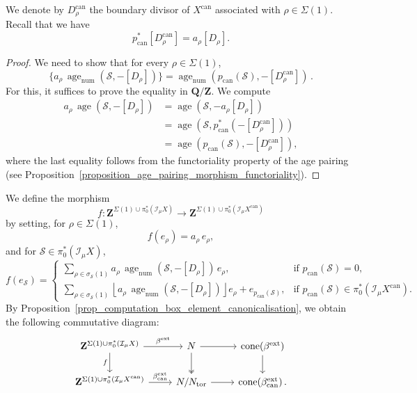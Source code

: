 \documentclass{proc-l}
\newcommand{\Z}{\mathbf{Z}}
\newcommand{\Q}{\mathbf{Q}}
\newcommand{\I}{\mathcal{I}}
\DeclareMathOperator{\can}{can}
\DeclareMathOperator{\coneform}{cone}
\DeclareMathOperator{\num}{num}
\DeclareMathOperator{\age}{age}
\DeclareMathOperator{\tor}{tor}
\DeclareMathOperator{\ext}{ext}
\newcommand{\stackS}{\mathcal{S}}
\newcommand{\sheafI}{\mathcal{I}}
\newcommand{\twistsector}{\pi_0^*(\sheafI_{\mu} X)}
\theoremstyle{definition}
\theoremstyle{remark}
\numberwithin{equation}{section}
\begin{document}
We denote by $D_{\rho}^{\can}$ the boundary divisor of $X^{\can}$ associated with $\rho \in \Sigma(1)$. Recall that we have
$$
p_{\can}^*[D^{\can}_{\rho}] = a_{\rho}[D_{\rho}] .
$$

\begin{proof}
We need to show that for every $\rho \in \Sigma(1)$,
$$
\{a_{\rho}\,\age_{\num}(\stackS,-[D_{\rho}]) \}
=
\age_{\num}(p_{\can}(\stackS),-[D^{\can}_{\rho}]) \, .
$$
For this, it suffices to prove the equality in $\Q/\Z$. We compute
\begin{align*}
a_{\rho}\,\age(\stackS,-[D_{\rho}])
&=
\age(\stackS,-a_{\rho}[D_{\rho}]) \\
&=
\age(\stackS,p_{\can}^*(-[D^{\can}_{\rho}])) \\
&=
\age(p_{\can}(\stackS),-[D^{\can}_{\rho}]),
\end{align*}
where the last equality follows from the functoriality property of the age pairing (see Proposition~\ref{proposition_age_pairing_morphism_functoriality}).
\end{proof}

We define the morphism
$$
f : \Z^{\Sigma(1) \cup \twistsector}
\longrightarrow
\Z^{\Sigma(1) \cup \pi_0^*(\I_{\mu} X^{\can})}
$$
by setting, for $\rho \in \Sigma(1)$,
\[
f(e_{\rho}) = a_{\rho}\, e_{\rho},
\]
and for $\stackS \in \twistsector$,
\[
f(e_{\stackS}) =
\begin{cases}
\displaystyle
\sum_{\rho \in \sigma_\stackS(1)}
a_{\rho}\,
\age_{\num}\!\left(\stackS,-[D_{\rho}]\right)\, e_{\rho},
& \text{if } p_{\can}(\stackS)=0, \\[1.6em]
\displaystyle
\sum_{\rho \in \sigma_\stackS(1)}
\left\lfloor
a_{\rho}\,
\age_{\num}\!\left(\stackS,-[D_{\rho}]\right)
\right\rfloor e_{\rho}
+
e_{p_{\can}(\stackS)},
& \text{if } p_{\can}(\stackS)\in \pi_0^*(\I_{\mu} X^{\can}).
\end{cases}
\]
By Proposition~\ref{prop_computation_box_element_canonicalisation}, we obtain the following commutative diagram:
\begin{equation}\label{equation_diagram_lift_canonical_map_extended_torsor}
\begin{tikzcd}
\Z^{\Sigma(1) \cup \twistsector} \arrow[r, "\beta^{\ext}"] \arrow[d, "f"']      & N \arrow[r] \arrow[d, two heads] & \coneform(\beta^{\ext}) \arrow[d] \\
\Z^{\Sigma(1) \cup \pi_0^*(\I_{\mu} X^{\can})} \arrow[r, "\beta^{\ext}_{\can}"] & N / N_{\tor} \arrow[r]           & \coneform(\beta^{\ext}_{\can}) \, .   
\end{tikzcd}
\end{equation}
\end{document}
